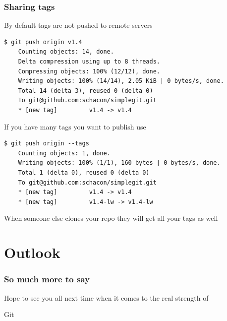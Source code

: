 \documentclass{beamer}
\begin{document}
\begin{frame}[fragile]
  \frametitle{Sharing tags}
  By default tags are not pushed to remote servers
  \begin{lstlisting}[basicstyle=\ttfamily\tiny]
    $ git push origin v1.4
    Counting objects: 14, done.
    Delta compression using up to 8 threads.
    Compressing objects: 100% (12/12), done.
    Writing objects: 100% (14/14), 2.05 KiB | 0 bytes/s, done.
    Total 14 (delta 3), reused 0 (delta 0)
    To git@github.com:schacon/simplegit.git
    * [new tag]         v1.4 -> v1.4
  \end{lstlisting}
  If you have many tags you want to publish use
  \begin{lstlisting}[basicstyle=\ttfamily\tiny]
    $ git push origin --tags
    Counting objects: 1, done.
    Writing objects: 100% (1/1), 160 bytes | 0 bytes/s, done.
    Total 1 (delta 0), reused 0 (delta 0)
    To git@github.com:schacon/simplegit.git
    * [new tag]         v1.4 -> v1.4
    * [new tag]         v1.4-lw -> v1.4-lw
  \end{lstlisting}
  When someone else clones your repo they will get all your tags as well
\end{frame}

\section{Outlook}
\begin{frame}
  \frametitle{So much more to say}
  Hope to see you all next time when it comes to the real strength of

  \centering\Huge Git
\end{frame}
\end{document}
